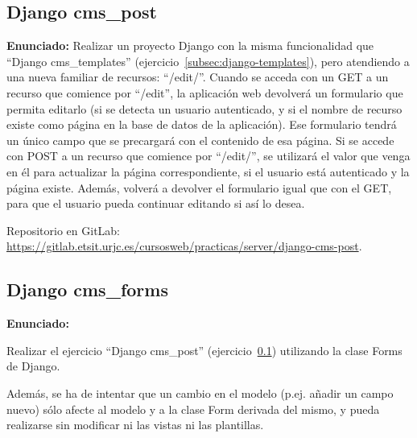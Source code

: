 
\subsection{Django cms\_post}
\label{subsec:django-post}

\textbf{Enunciado:}
 Realizar un proyecto Django con la misma funcionalidad que ``Django cms\_templates'' (ejercicio~\ref{subsec:django-templates}), pero atendiendo a una nueva familiar de recursos: ``/edit/''. Cuando se acceda con un GET a un recurso que comience por ``/edit'', la aplicación web devolverá un formulario que permita editarlo (si se detecta un usuario autenticado, y si el nombre de recurso existe como página en la base de datos de la aplicación). Ese formulario tendrá un único campo que se precargará con el contenido de esa página. Si se accede con POST a un recurso que comience por ``/edit/'', se utilizará el valor que venga en él para actualizar la página correspondiente, si el usuario está autenticado y la página existe. Además, volverá a devolver el formulario igual que con el GET, para que el usuario pueda continuar editando si así lo desea.
 
Repositorio en GitLab: \\
\url{https://gitlab.etsit.urjc.es/cursosweb/practicas/server/django-cms-post}.

\subsection{Django cms\_forms}
\label{subsec:django-forms}

\textbf{Enunciado:}

Realizar el ejercicio ``Django cms\_post'' (ejercicio~\ref{subsec:django-post}) utilizando la clase Forms de Django. 

Además, se ha de intentar que un cambio en el modelo (p.ej. añadir un campo nuevo) sólo afecte al modelo y a la clase Form derivada del mismo, y pueda realizarse sin modificar ni las vistas ni las plantillas.

